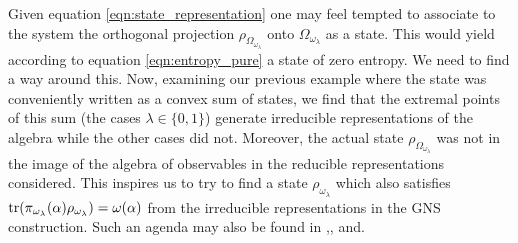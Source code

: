 Given equation \ref{eqn:state_representation} one may feel tempted to associate to the system the orthogonal projection $\rho_{\Omega_{\omega_\lambda}}$ onto $\Omega_{\omega_\lambda}$ as a state. This would yield according to equation \ref{eqn:entropy_pure} a state of zero entropy. We need to find a way around this. Now, examining our previous example where the state was conveniently written as a convex sum of states, we find that the extremal points of this sum (the cases $\lambda\in\{0,1\}$) generate irreducible representations of the algebra while the other cases did not. Moreover, the actual state $\rho_{\Omega_{\omega_\lambda}}$ was not in the image of the algebra of observables in the reducible representations considered. This inspires us to try to find a state $\rho_{\omega_\lambda}$ which also satisfies $\operatorname{tr}(\pi_{\omega_\lambda}(\alpha)\rho_{\omega_\lambda})=\omega(\alpha)$ from the irreducible representations in the GNS construction. Such an agenda may also be found in \cite{Balachandran2013c} ,\cite{Balachandran2013b}, \cite{Balachandran2013} and\cite{Balachandran2013a}.


